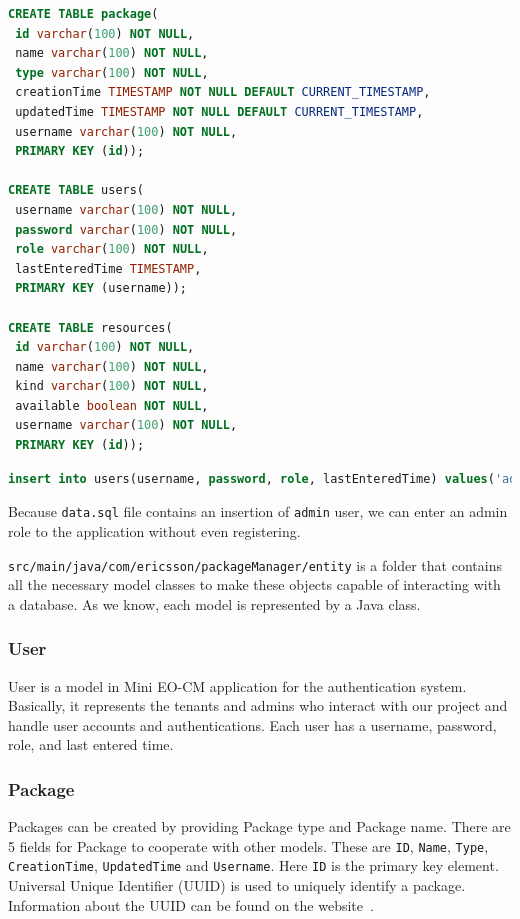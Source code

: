 \begin{lstlisting}[language={SQL}]
CREATE TABLE package(
 id varchar(100) NOT NULL,
 name varchar(100) NOT NULL,
 type varchar(100) NOT NULL,
 creationTime TIMESTAMP NOT NULL DEFAULT CURRENT_TIMESTAMP,
 updatedTime TIMESTAMP NOT NULL DEFAULT CURRENT_TIMESTAMP,
 username varchar(100) NOT NULL,
 PRIMARY KEY (id));

CREATE TABLE users(
 username varchar(100) NOT NULL,
 password varchar(100) NOT NULL,
 role varchar(100) NOT NULL,
 lastEnteredTime TIMESTAMP,
 PRIMARY KEY (username));

CREATE TABLE resources(
 id varchar(100) NOT NULL,
 name varchar(100) NOT NULL,
 kind varchar(100) NOT NULL,
 available boolean NOT NULL,
 username varchar(100) NOT NULL,
 PRIMARY KEY (id));
\end{lstlisting}

\begin{lstlisting}[language={SQL}]
insert into users(username, password, role, lastEnteredTime) values('admin','Qr6AgNbWILBmh7UBoHkEJHUH7TVd2eCpgFtB7csx7ABOW2NbOh4xU0WoAHp0oFN5','admin', null);
\end{lstlisting}

Because \texttt{data.sql} file contains an insertion of \texttt{admin} user, we can enter an admin role to the application without even registering. 

\texttt{src/main/java/com/ericsson/packageManager/entity} is a folder that contains all the necessary model classes to make these objects capable of interacting with a database. As we know, each model is represented by a Java class.

\subsubsection{User}
User is a model in Mini EO-CM application for the authentication system. Basically, it represents the tenants and admins who interact with our project and handle user accounts and authentications. Each user has a username, password, role, and last entered time.

\subsubsection{Package}
Packages can be created by providing Package type and Package name. There are 5 fields for Package to cooperate with other models. These are \texttt{ID}, \texttt{Name}, \texttt{Type}, \texttt{CreationTime}, \texttt{UpdatedTime} and \texttt{Username}. Here \texttt{ID} is the primary key element. Universal Unique Identifier (UUID) is used to uniquely identify a package. Information about the UUID can be found on the website~\cite{uuid-id}.


